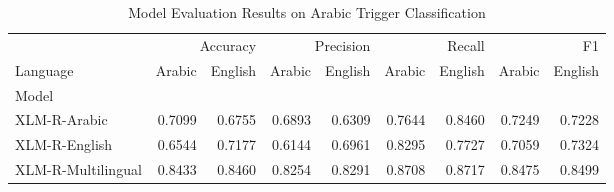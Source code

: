 \begin{table}
\caption{Model Evaluation Results on Arabic Trigger Classification}
\label{tab:model_comparison}
\begin{tabular}{lrrrrrrrr}
\toprule
 & \multicolumn{2}{r}{Accuracy} & \multicolumn{2}{r}{Precision} & \multicolumn{2}{r}{Recall} & \multicolumn{2}{r}{F1} \\
Language & Arabic & English & Arabic & English & Arabic & English & Arabic & English \\
Model &  &  &  &  &  &  &  &  \\
\midrule
XLM-R-Arabic & 0.7099 & 0.6755 & 0.6893 & 0.6309 & 0.7644 & 0.8460 & 0.7249 & 0.7228 \\
XLM-R-English & 0.6544 & 0.7177 & 0.6144 & 0.6961 & 0.8295 & 0.7727 & 0.7059 & 0.7324 \\
XLM-R-Multilingual & 0.8433 & 0.8460 & 0.8254 & 0.8291 & 0.8708 & 0.8717 & 0.8475 & 0.8499 \\
\bottomrule
\end{tabular}
\end{table}
